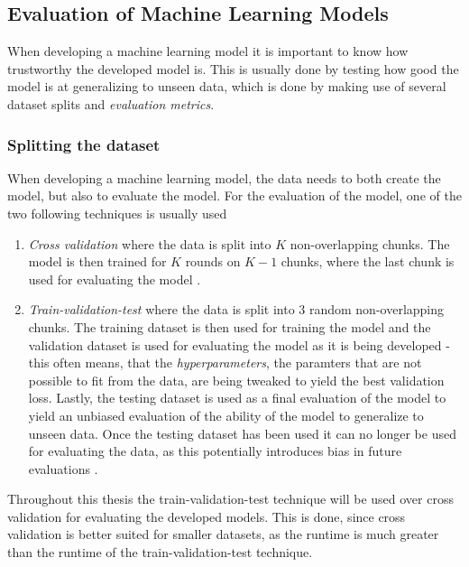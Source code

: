 \documentclass[./main.tex]{subfiles}
\begin{document}
\subsection{Evaluation of Machine Learning Models}\label{subsec:evaluation}
When developing a machine learning model it is important to know how trustworthy the developed model is. This is usually done by testing how good the model is at generalizing to unseen data, which is done by making use of several dataset splits and \textit{evaluation metrics}.

\subsubsection{Splitting the dataset}
When developing a machine learning model, the data needs to both create the model, but also to evaluate the model. For the evaluation of the model, one of the two following techniques is usually used

\begin{enumerate}
    \item \textit{Cross validation} where the data is split into $K$ non-overlapping chunks. The model is then trained for $K$ rounds on $K - 1$ chunks, where the last chunk is used for evaluating the model \cite{MAD_book}.
    \item \textit{Train-validation-test} where the data is split into $3$ random non-overlapping chunks. The training dataset is then used for training the model and the validation dataset is used for evaluating the model as it is being developed - this often means, that the \textit{hyperparameters}, the paramters that are not possible to fit from the data, are being tweaked to yield the best validation loss. Lastly, the testing dataset is used as a final evaluation of the model to yield an unbiased evaluation of the ability of the model to generalize to unseen data. Once the testing dataset has been used it can no longer be used for evaluating the data, as this potentially introduces bias in future evaluations \cite{MAD_L3}.
\end{enumerate}
Throughout this thesis the train-validation-test technique will be used over cross validation for evaluating the developed models. This is done, since cross validation is better suited for smaller datasets, as the runtime is much greater than the runtime of the train-validation-test technique.
\end{document}
